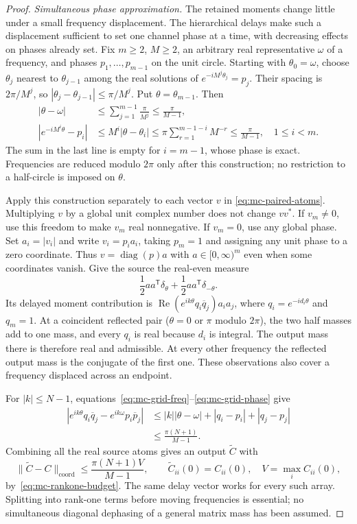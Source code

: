 \begin{proof}
\emph{Simultaneous phase approximation.}
The retained moments change little under a small frequency displacement. The hierarchical delays make such a displacement sufficient to set one channel phase at a time, with decreasing effects on phases already set.
Fix $m\ge2$, $M\ge2$, an arbitrary real representative $\omega$ of a
frequency, and phases $p_1,\ldots,p_{m-1}$ on the unit circle. Starting
with $\theta_0=\omega$, choose $\theta_j$ nearest to $\theta_{j-1}$ among
the real solutions of $e^{-iM^j\theta_j}=p_j$. Their spacing is
$2\pi/M^j$, so $|\theta_j-\theta_{j-1}|\le\pi/M^j$. Put
$\theta=\theta_{m-1}$. Then
\begin{align}
 |\theta-\omega|&\le\sum_{j=1}^{m-1}\frac\pi{M^j}
                         \le\frac\pi{M-1},\label{eq:mc-grid-freq}\\
 |e^{-iM^i\theta}-p_i|
 &\le M^i|\theta-\theta_i|
 \le\pi\sum_{r=1}^{m-1-i}M^{-r}
 \le\frac\pi{M-1},\quad 1\le i<m.\label{eq:mc-grid-phase}
\end{align}
The sum in the last line is empty for $i=m-1$, whose phase is exact.
Frequencies are reduced modulo $2\pi$ only after this construction;
no restriction to a half-circle is imposed on $\theta$.

Apply this construction separately to each vector $v$ in
\eqref{eq:mc-paired-atoms}. Multiplying $v$ by a global unit complex
number does not change $vv^*$. If $v_m\ne0$, use this freedom to make
$v_m$ real nonnegative. If $v_m=0$, use any global phase. Set
$a_i=|v_i|$ and write $v_i=p_i a_i$, taking $p_m=1$ and assigning any
unit phase to a zero coordinate. Thus $v=\operatorname{diag}(p)a$ with
$a\in[0,\infty)^m$ even when some coordinates vanish. Give the source
the real-even measure
\[
 \frac12 aa^{\mathsf T}\delta_\theta+
 \frac12 aa^{\mathsf T}\delta_{-\theta}.
\]
Its delayed moment contribution is
$\operatorname{Re}(e^{ik\theta}q_i\overline q_j)a_i a_j$, where
$q_i=e^{-id_i\theta}$ and $q_m=1$. At a coincident reflected pair
($\theta=0$ or $\pi$ modulo $2\pi$), the two half masses add to one
mass, and every $q_i$ is real because $d_i$ is integral. The output mass
there is therefore real and admissible. At every other frequency the
reflected output mass is the conjugate of the first one. These
observations also cover a frequency displaced across an endpoint.

For $|k|\le N-1$, equations~\eqref{eq:mc-grid-freq}--\eqref{eq:mc-grid-phase}
give
\begin{align*}
 |e^{ik\theta}q_i\overline q_j-e^{ik\omega}p_i\overline p_j|
 &\le |k||\theta-\omega|+|q_i-p_i|+|q_j-p_j|\\
 &\le\frac{\pi(N+1)}{M-1}.
\end{align*}
Combining all the real source atoms gives an output $\widetilde C$ with
\begin{equation}\label{eq:mc-approx}
 \|\widetilde C-C\|_{\mathrm{coord}}
 \le\frac{\pi(N+1)V}{M-1},\qquad
 \widetilde C_{ii}(0)=C_{ii}(0),\quad
 V=\max_i C_{ii}(0),
\end{equation}
by~\eqref{eq:mc-rankone-budget}. The same delay vector works for every
such array. Splitting into rank-one terms before moving frequencies is
essential; no simultaneous diagonal dephasing of a general matrix mass
has been assumed.


\end{proof}
